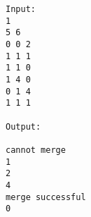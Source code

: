\begin{verbatim}
Input:
1
5 6
0 0 2
1 1 1
1 1 0
1 4 0
0 1 4
1 1 1 

Output:

cannot merge
1
2
4
merge successful
0
\end{verbatim}